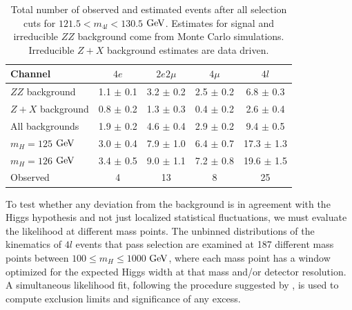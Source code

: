 \begin{table}[htbp]
\begin{center}
\begin{tabular}{l|c|c|c|c}
\hline \hline
      Channel        & $4e$ & $2e2\mu$ & $4\mu$  & $4l$ \\
      \hline
      $ZZ$ background &  1.1  $\pm$  0.1  &  3.2  $\pm$  0.2  &  2.5  $\pm$  0.2  &  6.8 $\pm$ 0.3  \\
      $Z + X$ background &  0.8  $\pm$  0.2  &  1.3  $\pm$  0.3  &  0.4  $\pm$  0.2  &  2.6 $\pm$ 0.4 \\
      \hline
      All backgrounds            &  1.9  $\pm$  0.2   &  4.6  $\pm$ 0.4  & 2.9  $\pm$ 0.2  & 9.4  $\pm$ 0.5\\
      \hline
      $m_H =  125$ $\rm{GeV}$ &  3.0  $\pm$  0.4  &  7.9  $\pm$  1.0  &  6.4  $\pm$  0.7  & 17.3  $\pm$ 1.3 \\
      $m_H =  126$ $\rm{GeV}$ &  3.4  $\pm$  0.5  &  9.0  $\pm$  1.1  &  7.2  $\pm$  0.8  & 19.6  $\pm$ 1.5 \\
      \hline
      Observed  & 4 & 13 & 8 & 25 \\
\hline \hline
\end{tabular}
\caption[Number of Observed $4l$ Events in $121.5 < m_{4l} < 130.5$ $\rm{GeV}$]{Total number of observed and estimated events after all selection cuts for $121.5 < m_{4l} < 130.5$ $\rm{GeV}$. Estimates for signal and irreducible $ZZ$ background come from Monte Carlo simulations. Irreducible $Z+X$ background estimates are data driven.
\label{tbl:ZZ4lEventsNarrowRange}}
\end{center}
\end{table}

To test whether any deviation from the background is in agreement with the Higgs hypothesis and not just localized statistical fluctuations, we must evaluate the likelihood at different mass points. The unbinned distributions of the kinematics of $4l$ events that pass selection are examined at 187 different mass points between $100\leq m_{H} \leq 1000$ $\rm{GeV}$, where each mass point has a window optimized for the expected Higgs width at that mass and/or detector resolution. A simultaneous likelihood fit, following the procedure suggested by \cite{}, is used to compute exclusion limits and significance of any excess.

